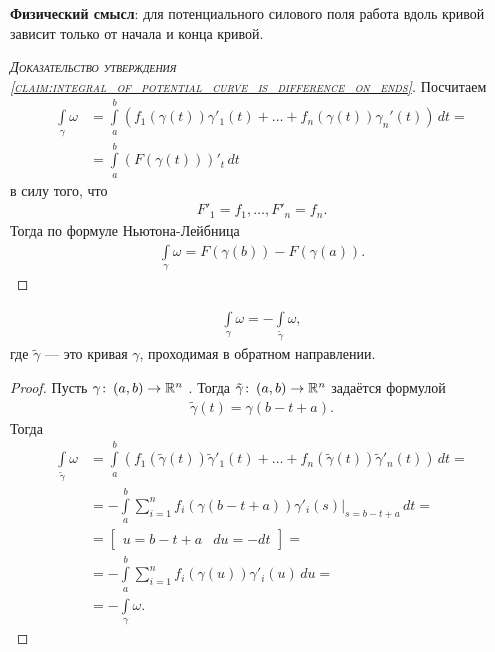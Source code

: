 \textbf{Физический смысл}: для потенциального силового поля работа вдоль кривой зависит только от начала и конца кривой.

\begin{proof}[\normalfont\textsc{Доказательство утверждения \ref{claim:integral_of_potential_curve_is_difference_on_ends}}]
 Посчитаем
 \begin{align*}
  \int\limits_{\gamma} \omega &= \int\limits_{a}^{b} \left( f_1(\gamma(t)) \gamma'_1(t) + \ldots + f_n(\gamma(t))\gamma_n'(t) \right) \, dt = \\
  &= \int\limits_{a}^{b} \left( F(\gamma(t)) \right)'_t \, dt
 \end{align*}  в силу того, что
 \begin{align*}
  F'_1 = f_1, \ldots, F'_n = f_n
 .\end{align*} Тогда по формуле Ньютона-Лейбница
 \begin{align*}
  \int\limits_{\gamma} \omega = F(\gamma(b)) - F(\gamma(a))
 .\end{align*} 
\end{proof}

\begin{claim}
 \begin{align*}
  \int\limits_{\gamma} \omega = - \int\limits_{\tilde \gamma} \omega
 ,\end{align*} где $\tilde \gamma$ --- это кривая $\gamma$, проходимая в обратном направлении.
\end{claim}
\begin{proof}
  Пусть $\gamma \colon\, (a,b) \to \mathbb{R}^{n}$ . Тогда $\tilde \gamma \colon\, (a, b) \to \mathbb{R}^{n}$  задаётся формулой
 \begin{align*}
  \tilde \gamma (t) = \gamma(b - t + a)
 .\end{align*} Тогда
 \begin{align*}
  \int\limits_{\tilde \gamma} \omega &= \int\limits_{a}^{b} \left( f_1(\tilde \gamma(t))\tilde \gamma'_1(t) + \ldots + f_n(\tilde \gamma(t))\tilde \gamma'_n(t) \right) \, dt = \\
  &= -\int\limits_{a}^{b} \sum_{i=1}^{n} f_i(\gamma(b-t+a))\gamma'_i(s) \rvert_{s=b-t+a} \, dt = \\
  &= \begin{bmatrix}
   u = b - t + a & du = -dt
  \end{bmatrix} = \\
  &= - \int\limits_{a}^{b} \sum_{i=1}^{n} f_i(\gamma(u))\gamma'_i(u) \, du = \\
  &= -\int\limits_{\gamma} \omega
 .\end{align*} 
\end{proof}

